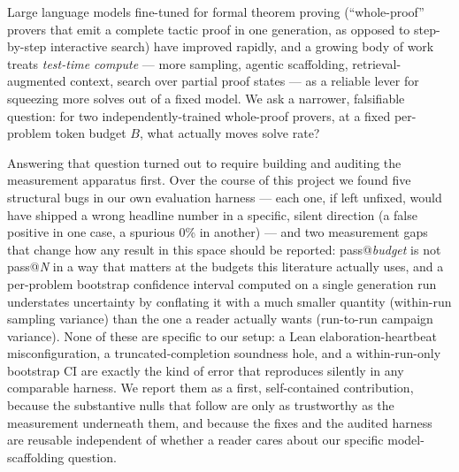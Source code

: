 \documentclass{article}
\begin{document}
Large language models fine-tuned for formal theorem proving (``whole-proof'' provers that emit a
complete tactic proof in one generation, as opposed to step-by-step interactive search) have improved
rapidly, and a growing body of work treats \emph{test-time compute} --- more sampling, agentic
scaffolding, retrieval-augmented context, search over partial proof states --- as a reliable lever for
squeezing more solves out of a fixed model. We ask a narrower, falsifiable question: for two
independently-trained whole-proof provers, at a fixed per-problem token budget $B$, what actually moves
solve rate?

Answering that question turned out to require building and auditing the measurement apparatus first.
Over the course of this project we found five structural bugs in our own evaluation harness --- each
one, if left unfixed, would have shipped a wrong headline number in a specific, silent direction (a
false positive in one case, a spurious 0\% in another) --- and two measurement gaps that change how any
result in this space should be reported: pass@\emph{budget} is not pass@\emph{N} in a way that matters
at the budgets this literature actually uses, and a per-problem bootstrap confidence interval computed
on a single generation run understates uncertainty by conflating it with a much smaller quantity
(within-run sampling variance) than the one a reader actually wants (run-to-run campaign variance). None
of these are specific to our setup: a Lean elaboration-heartbeat misconfiguration, a truncated-completion
soundness hole, and a within-run-only bootstrap CI are exactly the kind of error that reproduces silently
in any comparable harness. We report them as a first, self-contained contribution, because the
substantive nulls that follow are only as trustworthy as the measurement underneath them, and because
the fixes and the audited harness are reusable independent of whether a reader cares about our specific
model-scaffolding question.
\end{document}
